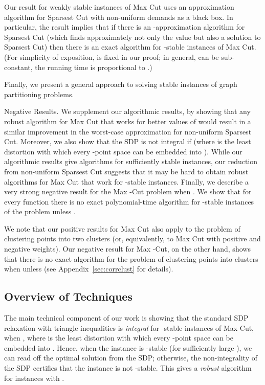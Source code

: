 \documentclass[twoside,leqno,twocolumn]{article}
\makeatletter
\def\paragraph{\@startsection  
 {paragraph}{4}{\parindent}{5pt}{-5pt}{\normalsize\bf}}
\makeatother
\begin{document}
Our result for weakly stable instances of Max Cut uses an approximation algorithm for Sparsest Cut with non-uniform demands
as a black box. In particular, the result implies that if there is an -approximation algorithm for Sparsest Cut (which finds approximately not only the value but also a solution to Sparsest Cut) 
then there is an exact algorithm for -stable instances of Max Cut. (For simplicity of exposition,
 is fixed in our proof; in general,  can be sub-constant, the running time
is proportional to .)

Finally, we present a general approach to solving stable instances of graph partitioning problems.

\paragraph{Negative Results.} We supplement our algorithmic results, by showing that any robust algorithm for Max Cut that works for better values of  would result in a similar improvement in the worst-case approximation for non-uniform Sparsest Cut. Moreover, we also show that the SDP is not integral if  (where  is the least distortion with which every -point  space can be embedded into ). While our algorithmic results give algorithms for sufficiently stable instances, our reduction from non-uniform Sparsest Cut suggests that it may be hard to obtain robust algorithms for Max Cut that work for -stable instances. 
Finally, we describe a very strong negative result for the Max -Cut problem when .
We show that for every function  there is no exact polynomial-time algorithm for -stable instances of the problem
unless .

We note that our positive results for Max Cut also apply to the problem of clustering points into two clusters (or, equivalently, to Max Cut
with positive and negative weights). Our negative result for Max -Cut, on the other hand, shows that there is no exact algorithm for
the problem of clustering points into  clusters when  unless  (see Appendix~\ref{sec:corrclust} for details). 

\subsection{Overview of Techniques}

The main technical component of our work is showing that the standard SDP relaxation with triangle inequalities
is {\em integral} for -stable instances of Max Cut, when , where
 is the least distortion with which every -point  space can be embedded into .
Hence, when the instance is -stable (for sufficiently large ), we can read off the optimal solution from the SDP; otherwise, the non-integrality of the SDP certifies that the instance is not -stable. This gives a {\em robust} algorithm for instances with .
\end{document}
